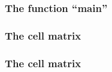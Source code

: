 \begin{frame}[t]
  \frametitle{The function ``main''}
  
\end{frame}

\begin{frame}[t]
  \frametitle{The cell matrix}
  
\end{frame}

\begin{frame}[t]
  \frametitle{The cell matrix}
  
\end{frame}

